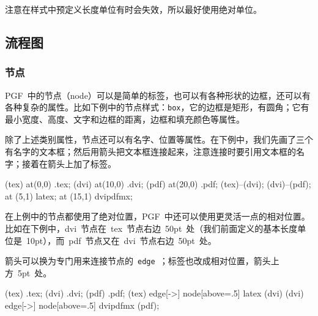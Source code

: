 注意在样式中预定义长度单位有时会失效，所以最好使用绝对单位。

\subsection{流程图}
\subsubsection{节点}
PGF~中的节点（node）可以是简单的标签，也可以有各种形状的边框，还可以有各种复杂的属性。比如下例中的节点样式：\verb|box|，它的边框是矩形，有圆角；它有最小宽度、高度、文字和边框的距离，边框和填充颜色等属性。

\begin{code}
\end{code}

除了上述类别属性，节点还可以有名字、位置等属性。在下例中，我们先画了三个有名字的文本框；然后用箭头把文本框连接起来，注意连接时要引用文本框的名字；接着在箭头上加了标签。
\begin{code}
\node[box] (tex) at(0,0) {.tex};  %
\node[box] (dvi) at(10,0) {.dvi}; %
\node[box] (pdf) at(20,0) {.pdf}; %
\draw[->] (tex)--(dvi);           %
\draw[->] (dvi)--(pdf);           %
\node at (5,1) {latex};           %
\node at (15,1) {dvipdfmx};       %
\end{code}

\begin{out}
\end{out}

在上例中的节点都使用了绝对位置，PGF~中还可以使用更灵活一点的相对位置。比如在下例中，dvi~节点在~tex~节点右边~50pt~处（我们前面定义的基本长度单位是~10pt），而~pdf~节点又在~dvi~节点右边~50pt~处。

箭头可以换为专门用来连接节点的~\verb|edge|~；标签也改成相对位置，箭头上方~5pt~处。
\begin{code}
\node[box] (tex) {.tex};
\node[box,right=5 of tex] (dvi) {.dvi};
\node[box,right=6 of dvi] (pdf) {.pdf};
\path (tex) edge[->]  node[above=.5] {latex} (dvi)
    (dvi) edge[->] node[above=.5] {dvipdfmx} (pdf);
\end{code}

